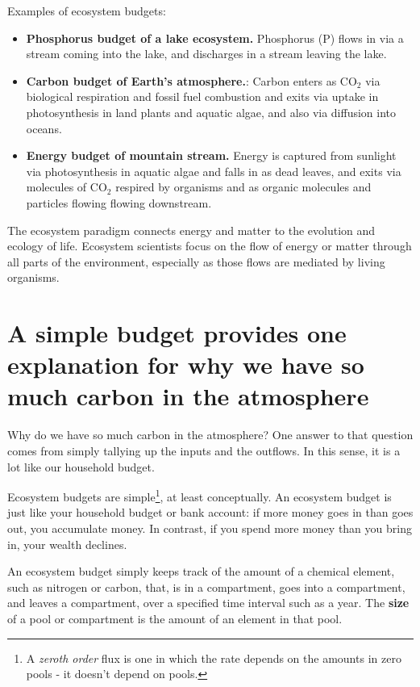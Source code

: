 \documentclass[
  letterpaper,
  DIV=11,
  numbers=noendperiod]{scrreprt}
\providecommand{\tightlist}{%
  \setlength{\itemsep}{0pt}\setlength{\parskip}{0pt}}
\begin{document}
Examples of ecosystem budgets:

\begin{itemize}
\tightlist
\item
  \textbf{Phosphorus budget of a lake ecosystem.} Phosphorus (P) flows
  in via a stream coming into the lake, and discharges in a stream
  leaving the lake.
\item
  \textbf{Carbon budget of Earth's atmosphere.}: Carbon enters as
  CO\(_2\) via biological respiration and fossil fuel combustion and
  exits via uptake in photosynthesis in land plants and aquatic algae,
  and also via diffusion into oceans.
\item
  \textbf{Energy budget of mountain stream.} Energy is captured from
  sunlight via photosynthesis in aquatic algae and falls in as dead
  leaves, and exits via molecules of CO\(_2\) respired by organisms and
  as organic molecules and particles flowing flowing downstream.
\end{itemize}

The ecosystem paradigm connects energy and matter to the evolution and
ecology of life. Ecosystem scientists focus on the flow of energy or
matter through all parts of the environment, especially as those flows
are mediated by living organisms.

\section{A simple budget provides one explanation for why we have so
much carbon in the
atmosphere}\label{a-simple-budget-provides-one-explanation-for-why-we-have-so-much-carbon-in-the-atmosphere}

Why do we have so much carbon in the atmosphere? One answer to that
question comes from simply tallying up the inputs and the outflows. In
this sense, it is a lot like our household budget.

Ecosystem budgets are simple\footnote{A \emph{zeroth order} flux is one
  in which the rate depends on the amounts in zero pools - it doesn't
  depend on pools.}, at least conceptually. An ecosystem budget is just
like your household budget or bank account: if more money goes in than
goes out, you accumulate money. In contrast, if you spend more money
than you bring in, your wealth declines.

An ecosystem budget simply keeps track of the amount of a chemical
element, such as nitrogen or carbon, that, is in a compartment, goes
into a compartment, and leaves a compartment, over a specified time
interval such as a year. The \textbf{size} of a pool or compartment is
the amount of an element in that pool.
\end{document}
